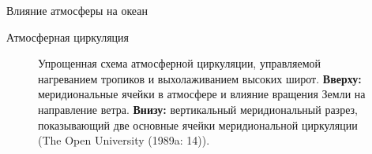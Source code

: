 \begin{chapter}{Влияние атмосферы на океан}
\begin{section}{Атмосферная циркуляция}
\begin{figure}[b!]
\vspace{-2ex}
\caption{Упрощенная схема атмосферной циркуляции, управляемой нагреванием 
тропиков и выхолаживанием высоких широт. 
\textbf{Вверху:} меридиональные ячейки в атмосфере и влияние вращения Земли на
направление ветра. 
\textbf{Внизу:} вертикальный меридиональный разрез, показывающий две основные 
ячейки меридиональной циркуляции (The Open University (1989a: 14)).}
\label{fig:atmosphere}
\end{figure}
%


\end{section}
\end{chapter}
